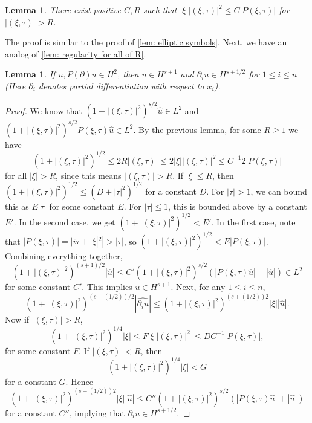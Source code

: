 \documentclass[12pt,letterpaper,reqno]{article}
\theoremstyle{plain}                              %
\newtheorem{lem}[thm]{Lemma}
\theoremstyle{definition}                         %
\theoremstyle{remark}                             %
\numberwithin{equation}{section}
\begin{document}
\begin{lem}
    There exist positive $C,R$ such that $|\xi| |(\xi,\tau)|^2 \le C |P(\xi,\tau)|$ for $|(\xi,\tau)|>R$.
\end{lem}
The proof is similar to the proof of \cref{lem: elliptic symbols}. Next, we have an analog of \cref{lem: regularity for all of R}.
\begin{lem}\label{lem: regularity for heat all of Rd}
    If $u, P(\partial) u\in H^2$, then $u\in H^{s+1}$ and $\partial_i u \in H^{s+1/2}$ for $1\le i\le n$ (Here $\partial_i$ denotes partial differentiation with respect to $x_i$).
\end{lem}
\begin{proof}
    We know that $(1+|(\xi,\tau)|^2)^{s/2}\widehat{u}\in L^2$ and $(1+|(\xi,\tau)|^2)^{s/2}P(\xi,\tau) \widehat{u}\in L^2$. By the previous lemma, for some $R\ge 1$ we have
    \[(1+|(\xi,\tau)|^2)^{1/2} \le 2 R|(\xi,\tau)| \le 2|\xi| |(\xi,\tau)|^2 \le C^{-1}2 |P(\xi,\tau)|\]
    for all $|\xi|>R$, since this means $|(\xi,\tau)|>R$. If $|\xi|\le R$, then $(1+|(\xi,\tau)|^2)^{1/2} \le (D+|\tau|^2)^{1/2}$ for a constant $D$. For $|\tau|>1$, we can bound this as $E |\tau|$ for some constant $E$. For $|\tau| \le 1$, this is bounded above by a constant $E'$. In the second case, we get $(1+|(\xi,\tau)|^2)^{1/2}<E'$. In the first case, note that $|P(\xi,\tau)| = |i\tau + |\xi|^2|>|\tau|$, so $(1+|(\xi,\tau)|^2)^{1/2} < E |P(\xi,\tau)|$.
    Combining everything together,
    \[(1+|(\xi,\tau)|^2)^{(s+1)/2}|\widehat{u}| \le C' (1+|(\xi,\tau)|^2)^{s/2}(|P(\xi,\tau) \widehat{u}|+|\widehat{u}|)\in L^2\]
    for some constant $C'$. This implies $u\in H^{s+1}$. Next, for any $1\le i\le n$,
    \[(1+|(\xi,\tau)|^2)^{(s+(1/2))/2} |\widehat{\partial_i u}| \le (1+|(\xi,\tau)|^2)^{(s+(1/2))2} |\xi | |\widehat{u}|.\]
    Now if $|(\xi,\tau)| >R$, 
    \[(1+|(\xi,\tau)|^2)^{1/4} |\xi|\le F |\xi| |(\xi,\tau)|^2\ \le DC^{-1} |P(\xi,\tau)|,\]
    for some constant $F$. If $|(\xi,\tau)|<R$, then
    \[(1+|(\xi,\tau)|^2)^{1/4} |\xi| <G\]
    for a constant $G$. Hence
    \[(1+|(\xi,\tau)|^2)^{(s+(1/2))2} |\xi | |\widehat{u}| \le C'' (1+|(\xi,\tau)|^2)^{s/2}(|P(\xi,\tau) \widehat{u}|+|\widehat{u}|)\]
    for a constant $C''$, implying that $\partial_i u\in H^{s+1/2}$.
\end{proof}
\end{document}
